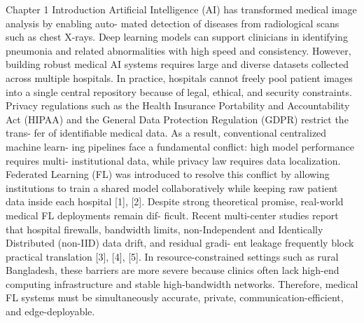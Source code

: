 Chapter 1
Introduction
Artificial Intelligence (AI) has transformed medical image analysis by enabling auto- mated detection of diseases from radiological scans such as chest X-rays. Deep learning models can support clinicians in identifying pneumonia and related abnormalities with high speed and consistency. However, building robust medical AI systems requires large and diverse datasets collected across multiple hospitals. In practice, hospitals cannot freely pool patient images into a single central repository because of legal, ethical, and security constraints.
Privacy regulations such as the Health Insurance Portability and Accountability
Act (HIPAA) and the General Data Protection Regulation (GDPR) restrict the trans- fer of identifiable medical data. As a result, conventional centralized machine learn- ing pipelines face a fundamental conflict:
high model performance requires multi- institutional data, while privacy law requires data localization.
Federated Learning (FL) was introduced to resolve this conflict by allowing institutions to train a shared model collaboratively while keeping raw patient data inside each hospital [1], [2].
Despite strong theoretical promise, real-world medical FL deployments remain dif- ficult.
Recent multi-center studies report that hospital firewalls, bandwidth limits, non-Independent and Identically Distributed (non-IID) data drift, and residual gradi- ent leakage frequently block practical translation [3], [4], [5]. In resource-constrained settings such as rural Bangladesh, these barriers are more severe because clinics often lack high-end computing infrastructure and stable high-bandwidth networks. Therefore, medical FL systems must be simultaneously accurate, private, communication-efficient, and edge-deployable.

